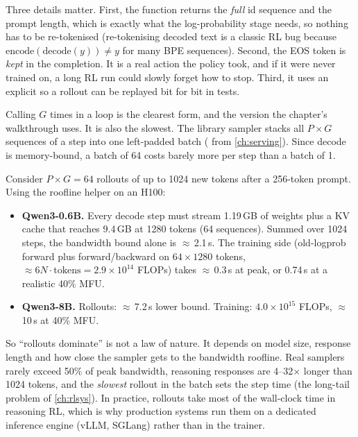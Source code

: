 Three details matter. First, the function returns the \emph{full} id sequence and the
prompt length, which is exactly what the log-probability stage needs, so nothing has to be
re-tokenised (re-tokenising decoded text is a classic RL bug because
$\text{encode}(\text{decode}(y))\neq y$ for many BPE sequences). Second, the EOS token is
\emph{kept} in the completion. It is a real action the policy took, and if it were never
trained on, a long RL run could slowly forget how to stop. Third, it uses an explicit
 so a rollout can be replayed bit for bit in tests.

Calling  $G$ times in a loop is the clearest form, and the version the
chapter's walkthrough uses. It is also the slowest. The library sampler
 stacks all $P\times G$ sequences of a step into one
left-padded batch ( from \cref{ch:serving}). Since decode is
memory-bound, a batch of 64 costs barely more per step than a batch of 1.

\begin{systemslens}
Consider $P\times G=64$ rollouts of up to 1024 new tokens after a 256-token prompt.
Using the roofline helper  on an H100:
\begin{itemize}
\item \textbf{Qwen3-0.6B.} Every decode step must stream 1.19\,GB of weights plus a KV
cache that reaches 9.4\,GB at 1280 tokens (64 sequences). Summed over 1024 steps, the
bandwidth bound alone is $\approx$\,2.1\,s. The training side (old-logprob forward plus
forward/backward on $64\times1280$ tokens, $\approx6N\!\cdot\!\text{tokens}=2.9\times10^{14}$
FLOPs) takes $\approx$\,0.3\,s at peak, or 0.74\,s at a realistic 40\% MFU.
\item \textbf{Qwen3-8B.} Rollouts: $\approx$\,7.2\,s lower bound. Training:
$4.0\times10^{15}$ FLOPs, $\approx$\,10\,s at 40\% MFU.
\end{itemize}
So ``rollouts dominate'' is not a law of nature. It depends on model size, response length
and how close the sampler gets to the bandwidth roofline. Real samplers rarely exceed 50\%
of peak bandwidth, reasoning responses are 4--32$\times$ longer than 1024 tokens, and the
\emph{slowest} rollout in the batch sets the step time (the long-tail problem of
\cref{ch:rlsys}). In practice, rollouts take most of the wall-clock time in reasoning RL,
which is why production systems run them on a dedicated inference engine (vLLM, SGLang)
rather than in the trainer.
\end{systemslens}

